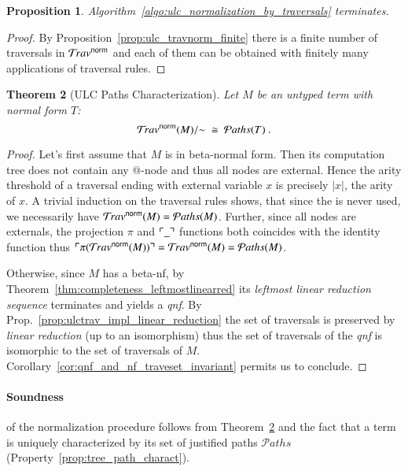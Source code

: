 \documentclass{elsarticle}
\theoremstyle{plain}
\newtheorem{theorem}{Theorem}[section]
\newtheorem{proposition}[theorem]{Proposition}
\theoremstyle{definition}
\theoremstyle{remark}
\newtheorem{remark}{Remark}[section]
\newcommand{\normalizing}{{\sf norm}}
\newcommand{\travsetnorm}{\travset^\normalizing}
\newcommand{\travulc}{\travset}
\def\coresymbol{\pi} %
\newcommand{\core}[1]{\coresymbol(#1)} %
\newcommand\pathset{{\mathcal{P}aths}} %
\begin{document}
\begin{proposition}
Algorithm~\ref{algo:ulc_normalization_by_traversals} terminates.
\end{proposition}
\begin{proof}
By Proposition~\ref{prop:ulc_travnorm_finite} there is a finite number of traversals in $\travsetnorm$ and each of them can be obtained with finitely many applications of traversal rules.
\end{proof}

\begin{theorem}[ULC Paths Characterization]
\label{thm:path_charact_ulc}
Let $M$ be an untyped term with normal form $T$:
$$\travsetnorm(M)/{\sim} \ \cong\ \pathset(T) \ .$$
\end{theorem}
\begin{proof}
Let's first assume that $M$ is in beta-normal form. Then its computation tree does not contain any $@$-node and thus all nodes are external.
Hence the arity threshold of a traversal ending with external variable $x$ is precisely $|x|$, the arity of $x$. A trivial induction on the traversal rules shows, that since the  is never used, we necessarily have  $\travsetnorm(M) = \pathset(M)$. Further, since all nodes are externals, the projection $\coresymbol$ and $\ulcorner \_ \urcorner$ functions both coincides with the identity function thus $\pview{\core{\travsetnorm(M)}} = \travsetnorm(M) = \pathset(M)$.

Otherwise, since $M$ has a beta-nf, by Theorem~\ref{thm:completeness_leftmostlinearred} its \emph{leftmost linear reduction sequence} terminates and yields a \emph{qnf}. By Prop.~\ref{prop:ulctrav_impl_linear_reduction} the set of traversals is preserved by \emph{linear reduction} (up to an isomorphism) thus the set of traversals of the \emph{qnf} is isomorphic to the set of traversals of $M$. Corollary~\ref{cor:qnf_and_nf_traveset_invariant} permits us to conclude.
\end{proof}

\paragraph{Soundness} of the normalization procedure follows from Theorem~\ref{thm:path_charact_ulc} and the fact that a term is uniquely characterized by its set of justified paths $\pathset$ (Property~\ref{prop:tree_path_charact}).

\end{document}
